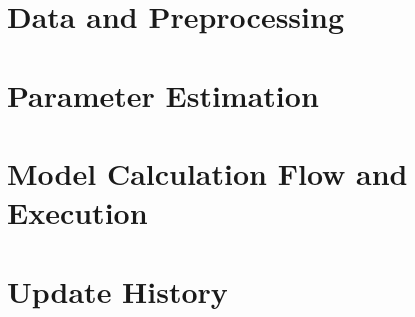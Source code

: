 \documentclass[11pt,a4paper,headings=small,parskip=half]{scrartcl}
\numberwithin{equation}{section}
\begin{document}
\section{Data and Preprocessing}\label{sec:data}


\section{Parameter Estimation}\label{sec:param}


\section[Model Calculation Flow and Execution]{\huge Model Calculation Flow and Execution}\label{sec:calc}


\section{Update History}


\printbibliography[
  title={References},
  heading=bibintoc
]

\appendix

\setcounter{figure}{0}
\renewcommand{\thefigure}{A\arabic{figure}}

\label{sec:appendix_a}


\setcounter{figure}{0}
\renewcommand{\thefigure}{B\arabic{figure}}

\label{sec:appendix_b}


\setcounter{table}{0}
\renewcommand{\thetable}{C\arabic{table}}

\label{sec:appendix_c}

\end{document}
